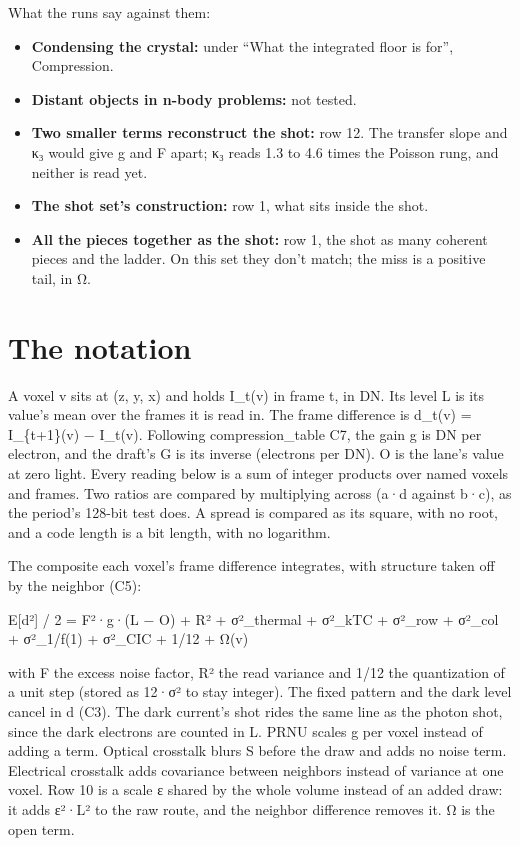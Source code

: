 What the runs say against them:

\begin{itemize}
\item \textbf{Condensing the crystal:} under “What the integrated floor is for”, Compression.
\item \textbf{Distant objects in n-body problems:} not tested.
\item \textbf{Two smaller terms reconstruct the shot:} row 12. The transfer slope and κ₃ would give g and F apart; κ₃ reads 1.3 to 4.6 times the Poisson rung, and neither is read yet.
\item \textbf{The shot set's construction:} row 1, what sits inside the shot.
\item \textbf{All the pieces together as the shot:} row 1, the shot as many coherent pieces and the ladder. On this set they don't match; the miss is a positive tail, in Ω.
\end{itemize}

\section{\texorpdfstring{The notation}{The notation}}

A voxel v sits at (z, y, x) and holds I\_\allowbreak{}t(v) in frame t, in DN. Its level L is its value's mean over the frames it is read in. The frame difference is d\_\allowbreak{}t(v) = I\_\allowbreak{}\{t+1\}(v) − I\_\allowbreak{}t(v). Following compression\_\allowbreak{}table C7, the gain g is DN per electron, and the draft's G is its inverse (electrons per DN). O is the lane's value at zero light. Every reading below is a sum of integer products over named voxels and frames. Two ratios are compared by multiplying across (a·d against b·c), as the period's 128-bit test does. A spread is compared as its square, with no root, and a code length is a bit length, with no logarithm.

The composite each voxel's frame difference integrates, with structure taken off by the neighbor (C5):

E[d²] / 2 = F²·g·(L − O) + R² + σ²\_\allowbreak{}thermal + σ²\_\allowbreak{}kTC + σ²\_\allowbreak{}row + σ²\_\allowbreak{}col + σ²\_\allowbreak{}1/f(1) + σ²\_\allowbreak{}CIC + 1/12 + Ω(v)

with F the excess noise factor, R² the read variance and 1/12 the quantization of a unit step (stored as 12·σ² to stay integer). The fixed pattern and the dark level cancel in d (C3). The dark current's shot rides the same line as the photon shot, since the dark electrons are counted in L. PRNU scales g per voxel instead of adding a term. Optical crosstalk blurs S before the draw and adds no noise term. Electrical crosstalk adds covariance between neighbors instead of variance at one voxel. Row 10 is a scale ε shared by the whole volume instead of an added draw: it adds ε²·L² to the raw route, and the neighbor difference removes it. Ω is the open term.

